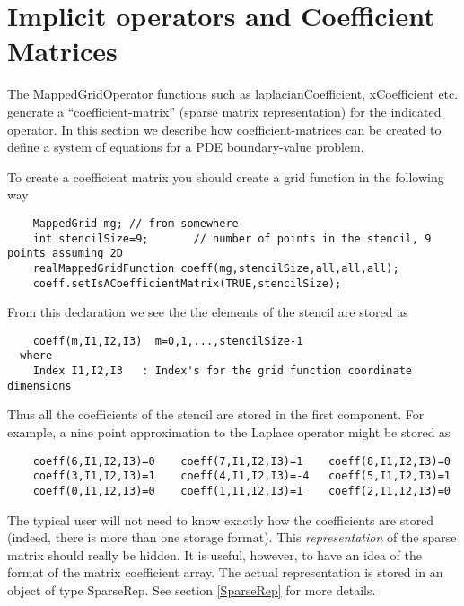 \section{Implicit operators and Coefficient Matrices}


The {\ff MappedGridOperator} functions such as {\ff laplacianCoefficient}, {\ff xCoefficient}
etc. generate a ``coefficient-matrix'' (sparse matrix representation) for the indicated operator.
In this section we describe how coefficient-matrices can be created to define a system 
of equations for a PDE boundary-value problem.

To create a coefficient matrix you should create a grid function in the following way
\begin{verbatim}
    MappedGrid mg; // from somewhere
    int stencilSize=9;       // number of points in the stencil, 9 points assuming 2D
    realMappedGridFunction coeff(mg,stencilSize,all,all,all);
    coeff.setIsACoefficientMatrix(TRUE,stencilSize);
\end{verbatim}

From this declaration we see the the elements of the stencil are stored as
\begin{verbatim}
    coeff(m,I1,I2,I3)  m=0,1,...,stencilSize-1
  where
    Index I1,I2,I3   : Index's for the grid function coordinate dimensions
\end{verbatim}
Thus all the coefficients of the stencil are stored in the first component.
For example, a nine point approximation to the Laplace operator might be stored as
\begin{verbatim}
    coeff(6,I1,I2,I3)=0    coeff(7,I1,I2,I3)=1    coeff(8,I1,I2,I3)=0
    coeff(3,I1,I2,I3)=1    coeff(4,I1,I2,I3)=-4   coeff(5,I1,I2,I3)=1
    coeff(0,I1,I2,I3)=0    coeff(1,I1,I2,I3)=1    coeff(2,I1,I2,I3)=0
\end{verbatim}
The typical user will not need to know exactly how the coefficients are
stored (indeed, there is more than one storage format). 
This {\it representation} of the sparse matrix should really 
be hidden. It is useful, however, to have an idea of the format of the
matrix coefficient array. The actual representation is stored in an object of
type {\ff SparseRep}. See section \ref{SparseRep} for more details.

